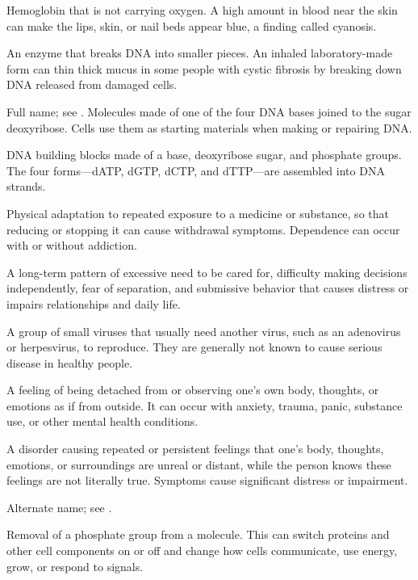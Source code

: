  Hemoglobin that is not carrying oxygen. A high amount in blood near the skin can make the lips, skin, or nail beds appear blue, a finding called cyanosis.

 An enzyme that breaks DNA into smaller pieces. An inhaled laboratory-made form can thin thick mucus in some people with cystic fibrosis by breaking down DNA released from damaged cells.

 Full name; see .
 Molecules made of one of the four DNA bases joined to the sugar deoxyribose. Cells use them as starting materials when making or repairing DNA.

 DNA building blocks made of a base, deoxyribose sugar, and phosphate groups. The four forms—dATP, dGTP, dCTP, and dTTP—are assembled into DNA strands.

 Physical adaptation to repeated exposure to a medicine or substance, so that reducing or stopping it can cause withdrawal symptoms. Dependence can occur with or without addiction.

 A long-term pattern of excessive need to be cared for, difficulty making decisions independently, fear of separation, and submissive behavior that causes distress or impairs relationships and daily life.

 A group of small viruses that usually need another virus, such as an adenovirus or herpesvirus, to reproduce. They are generally not known to cause serious disease in healthy people.

 A feeling of being detached from or observing one’s own body, thoughts, or emotions as if from outside. It can occur with anxiety, trauma, panic, substance use, or other mental health conditions.

 A disorder causing repeated or persistent feelings that one’s body, thoughts, emotions, or surroundings are unreal or distant, while the person knows these feelings are not literally true. Symptoms cause significant distress or impairment.

 Alternate name; see .

 Removal of a phosphate group from a molecule. This can switch proteins and other cell components on or off and change how cells communicate, use energy, grow, or respond to signals.


